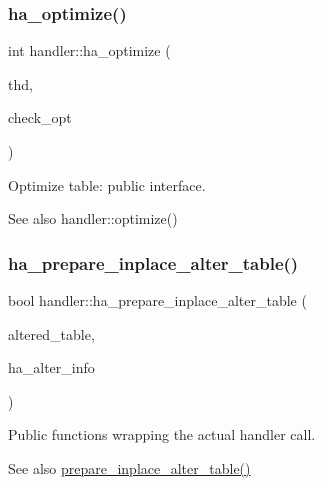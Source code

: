 \subsubsection{\texorpdfstring{ha\+\_\+optimize()}{ha\_optimize()}}
{\footnotesize\ttfamily int handler\+::ha\+\_\+optimize (\begin{DoxyParamCaption}\item[{T\+HD $\ast$}]{thd,  }\item[{\mbox{\hyperlink{structst__ha__check__opt}{H\+A\+\_\+\+C\+H\+E\+C\+K\+\_\+\+O\+PT}} $\ast$}]{check\+\_\+opt }\end{DoxyParamCaption})}

Optimize table\+: public interface.

\begin{DoxySeeAlso}{See also}
handler\+::optimize() 
\end{DoxySeeAlso}
\mbox{\label{classhandler_ad0ecf7f9bf265e6801b625768f0f2bbe}} 
\subsubsection{\texorpdfstring{ha\+\_\+prepare\+\_\+inplace\+\_\+alter\+\_\+table()}{ha\_prepare\_inplace\_alter\_table()}}
{\footnotesize\ttfamily bool handler\+::ha\+\_\+prepare\+\_\+inplace\+\_\+alter\+\_\+table (\begin{DoxyParamCaption}\item[{\mbox{\hyperlink{structTABLE}{T\+A\+B\+LE}} $\ast$}]{altered\+\_\+table,  }\item[{\mbox{\hyperlink{classAlter__inplace__info}{Alter\+\_\+inplace\+\_\+info}} $\ast$}]{ha\+\_\+alter\+\_\+info }\end{DoxyParamCaption})}

Public functions wrapping the actual handler call. \begin{DoxySeeAlso}{See also}
\mbox{\hyperlink{classhandler_ab25b3931a457f1821ba55ae9cce79d98}{prepare\+\_\+inplace\+\_\+alter\+\_\+table()}} 
\end{DoxySeeAlso}
\mbox{\label{classhandler_a9fe4a9e78c818aa2823c302f0fe65522}} 

